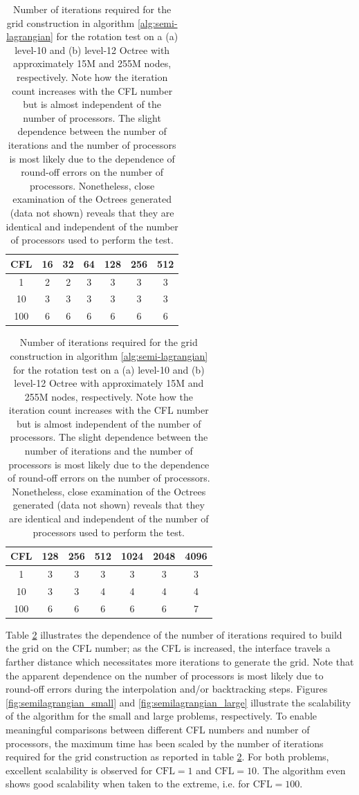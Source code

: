 \begin{table}[htbp]
	\begin{minipage}{.5\linewidth}
		\begin{center}
		\begin{tabular}{|c|cccccc|}
			\hline
				CFL & 16 & 32 & 64 & 128 & 256 & 512 \\
				\hline
				1   & 2 & 2 & 3 & 3 & 3 & 3 \\
				10  & 3 & 3 & 3 & 3 & 3 & 3 \\
				100 & 6 & 6 & 6 & 6 & 6 & 6 \\
			\hline
		\end{tabular}
		\caption*{(a) $l_\text{max} = 10$}
		\end{center}
	\end{minipage}%
	\begin{minipage}{.5\linewidth}
		\begin{center}
		\begin{tabular}{|c|cccccc|}
			\hline
				CFL & 128 & 256 & 512 & 1024 & 2048 & 4096 \\
			\hline
				1   & 3 & 3 & 3 & 3 & 3 & 3 \\
				10  & 3 & 3 & 4 & 4 & 4 & 4 \\
				100 & 6 & 6 & 6 & 6 & 6 & 7 \\
			\hline
		\end{tabular}
		\caption*{(b) $l_\text{max} = 12$}
		\end{center}
	\end{minipage}	
	\caption{Number of iterations required for the grid construction in algorithm \ref{alg:semi-lagrangian} for the rotation test on a (a) level-10 and (b) level-12 Octree with approximately 15M and 255M nodes, respectively. Note how the iteration count increases with the CFL number but is almost independent of the number of processors. The slight dependence between the number of iterations and the number of processors is most likely due to the dependence of round-off errors on the number of processors. Nonetheless, close examination of the Octrees generated (data not shown) reveals that they are identical and independent of the number of processors used to perform the test.}
	\label{tab:semilagrangian}
\end{table}

Table \ref{tab:semilagrangian} illustrates the dependence of the number of iterations required to build the grid on the CFL number; as the CFL is increased, the interface travels a farther distance which necessitates more iterations to generate the grid. Note that the apparent dependence on the number of processors is most likely due to round-off errors during the interpolation and/or backtracking steps. Figures \ref{fig:semilagrangian_small} and \ref{fig:semilagrangian_large} illustrate the scalability of the algorithm for the small and large problems, respectively. To enable meaningful comparisons between different CFL numbers and number of processors, the maximum time has been scaled by the number of iterations required for the grid construction as reported in table \ref{tab:semilagrangian}. For both problems, excellent scalability is observed for $\text{CFL} = 1$ and $\text{CFL} = 10$. The algorithm even shows good scalability when taken to the extreme, i.e. for $\text{CFL} = 100$.


